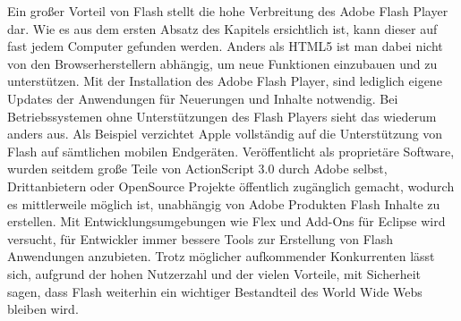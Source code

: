 Ein großer Vorteil von Flash stellt die hohe Verbreitung des Adobe Flash
Player dar. Wie es aus dem ersten Absatz des Kapitels ersichtlich ist,
kann dieser auf fast jedem Computer gefunden werden. Anders als HTML5 ist man
dabei nicht von den Browserherstellern abhängig, um neue Funktionen einzubauen
und zu unterstützen. Mit der Installation des Adobe Flash Player, sind
lediglich eigene Updates der Anwendungen für Neuerungen und Inhalte notwendig.
Bei Betriebssystemen ohne Unterstützungen des Flash Players sieht das wiederum
anders aus. Als Beispiel verzichtet Apple vollständig auf die Unterstützung
von Flash auf sämtlichen mobilen Endgeräten.
\newline\newline
Veröffentlicht als proprietäre Software, wurden seitdem große Teile von
ActionScript 3.0 durch Adobe selbst, Drittanbietern oder OpenSource Projekte
öffentlich zugänglich gemacht, wodurch es mittlerweile möglich ist,
unabhängig von Adobe Produkten Flash Inhalte zu erstellen. Mit
Entwicklungsumgebungen wie Flex und Add-Ons für Eclipse wird versucht, für
Entwickler immer bessere Tools zur Erstellung von Flash Anwendungen anzubieten.
\newline\newline
Trotz möglicher aufkommender Konkurrenten lässt sich,
aufgrund der hohen Nutzerzahl und der vielen Vorteile, mit Sicherheit sagen,
dass Flash weiterhin ein wichtiger Bestandteil des World Wide Webs bleiben
wird.

